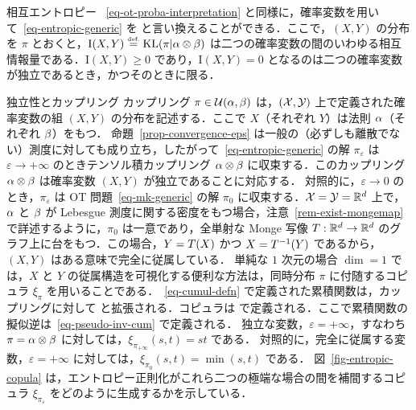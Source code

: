 \begin{rem2}{相互エントロピー}
~\eqref{eq-ot-proba-interpretation} と同様に，確率変数を用いて~\eqref{eq-entropic-generic} を
と言い換えることができる．ここで，$(X,Y)$ の分布を $\pi$ とおくと，$\text{I}(X,Y) \stackrel{\mbox{\upshape\tiny def.}}{=} \operatorname{KL}(\pi|\alpha\otimes\beta)$ は二つの確率変数の間のいわゆる相互情報量である．$\text{I}(X,Y) \geq 0$ であり，$\text{I}(X,Y)=0$ となるのは二つの確率変数が独立であるとき，かつそのときに限る．
\end{rem2}

\begin{rem2}{独立性とカップリング}
	カップリング $\pi \in \mathcal{U}(\alpha,\beta)$ は，$(\mathcal{X},\mathcal{Y})$ 上で定義された確率変数の組 $(X,Y)$ の分布を記述する．ここで $X$（それぞれ $Y$）は法則 $\alpha$（それぞれ $\beta$）をもつ．
	命題~\ref{prop-convergence-eps} は一般の（必ずしも離散でない）測度に対しても成り立ち，したがって~\eqref{eq-entropic-generic} の解 $\pi_\varepsilon$ は $\varepsilon \rightarrow+\infty$ のときテンソル積カップリング $\alpha \otimes \beta$ に収束する．このカップリング $\alpha \otimes \beta$ は確率変数 $(X,Y)$ が独立であることに対応する．
	対照的に，$\varepsilon \rightarrow 0$ のとき，$\pi_\varepsilon$ は OT 問題~\eqref{eq-mk-generic} の解 $\pi_0$ に収束する．$\mathcal{X}=\mathcal{Y}=\mathbb{R}^d$ 上で，$\alpha$ と $\beta$ が Lebesgue 測度に関する密度をもつ場合，注意~\ref{rem-exist-mongemap} で詳述するように，$\pi_0$ は一意であり，全単射な Monge 写像 $T : \mathbb{R}^d \rightarrow \mathbb{R}^d$ のグラフ上に台をもつ．この場合，$Y=T(X)$ かつ $X=T^{-1}(Y)$ であるから，$(X,Y)$ はある意味で完全に従属している．
	単純な $1$ 次元の場合 $\dim=1$ では，$X$ と $Y$ の従属構造を可視化する便利な方法は，同時分布 $\pi$ に付随するコピュラ $\xi_\pi$ を用いることである．~\eqref{eq-cumul-defn} で定義された累積関数は，カップリングに対して
	と拡張される．コピュラは
	で定義される．ここで累積関数の擬似逆は~\eqref{eq-pseudo-inv-cum} で定義される．
	独立な変数，$\varepsilon=+\infty$，すなわち $\pi=\alpha\otimes \beta$ に対しては，$\xi_{\pi_{+\infty}}(s,t)=st$ である．
	対照的に，完全に従属する変数，$\varepsilon=+\infty$ に対しては，$\xi_{\pi_0}(s,t)=\min(s,t)$ である．
	図~\ref{fig-entropic-copula} は，エントロピー正則化がこれら二つの極端な場合の間を補間するコピュラ $\xi_{\pi_\varepsilon}$ をどのように生成するかを示している．
\end{rem2}

